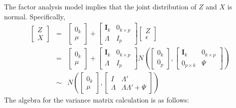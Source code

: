 The factor analysis model implies that the joint distribution of $Z$ and $X$ is normal. Specifically,
\begin{eqnarray*}
	\left[\begin{array}{c}
	Z\\ X
	\end{array}\right] &=& 
		\left[\begin{array}{c}
	0_k\\ \mu
	\end{array}\right] + \left[\begin{array}{cc}
		\mathbf{I}_k & 0_{k\times p} \\ \Lambda & I_{p}
	\end{array}\right]\left[\begin{array}{c}
		Z \\ \epsilon
	\end{array} \right]\\
	& = & \left[\begin{array}{c}
	0_k\\ \mu
	\end{array}\right] + \left[\begin{array}{cc}
		\mathbf{I}_k & 0_{k\times p} \\ \Lambda & I_{p}
	\end{array}\right]
	N\left(\left[\begin{array}{c}
		0_k \\ 0_p
	\end{array} \right], \left[\begin{array}{cc}
		\mathbf{I}_k & 0_{k\times p} \\ 0_{p\times k} & \Psi
	\end{array}\right]\right)\\
	&\sim & N\left(\left[\begin{array}{c}
	0_k \\ \mu
	\end{array}\right], \left[\begin{array}{cc}
		I & \Lambda'\\
		\Lambda & \Lambda \Lambda' + \Psi
	\end{array} \right] \right)
\end{eqnarray*}
The algebra for the variance matrix calculation is as follows:
